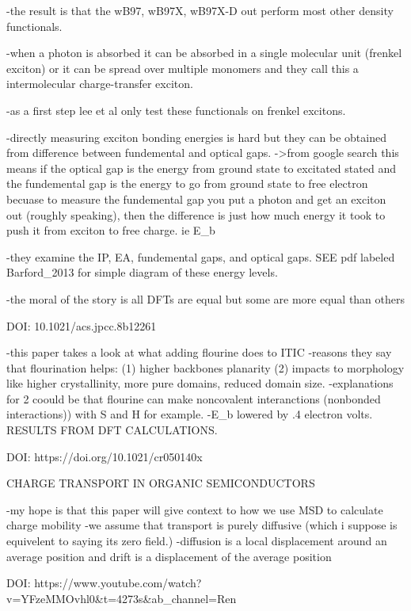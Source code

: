     -the result is that the wB97, wB97X, wB97X-D out perform most other density functionals.

    -when a photon is absorbed it can be absorbed in a single molecular unit (frenkel exciton)
    or it can be spread over multiple monomers and they call this a intermolecular charge-transfer
    exciton. 

    -as a first step lee et al only test these functionals on frenkel excitons. 

    -directly measuring exciton bonding energies is hard but they can be obtained from 
    difference between fundemental and optical gaps. ->from google search this means if the 
    optical gap is the energy from ground state to excitated stated and the fundemental gap
    is the energy to go from ground state to free electron becuase to measure the fundemental 
    gap you put a photon and get an exciton out (roughly speaking), then the difference is just
    how much energy it took to push it from exciton to free charge. ie E_{b}

    -they examine the IP, EA, fundemental gaps, and optical gaps. SEE pdf labeled Barford_2013
    for simple diagram of these energy levels.

    -the moral of the story is all DFTs are equal but some are more equal than others
    

DOI: 10.1021/acs.jpcc.8b12261

    -this paper takes a look at what adding flourine does to ITIC
    -reasons they say that flourination helps: (1) higher backbones planarity
    (2) impacts to morphology like higher crystallinity, more pure domains, reduced domain size.
    -explanations for 2 coould be that flourine can make noncovalent interanctions (nonbonded interactions))
    with S and H for example. 
    -E_{b} lowered by .4 electron volts. RESULTS FROM DFT CALCULATIONS. 


DOI: https://doi.org/10.1021/cr050140x

        CHARGE TRANSPORT IN ORGANIC SEMICONDUCTORS

    -my hope is that this paper will give context to how we use MSD to calculate charge mobility
    -we assume that transport is purely diffusive (which i suppose is equivelent to saying its 
    zero field.) 
    -diffusion is a local displacement around an average position and drift is a displacement of 
    the average position
    
DOI: https://www.youtube.com/watch?v=YFzeMMOvhl0&t=4273s&ab_channel=Ren%


